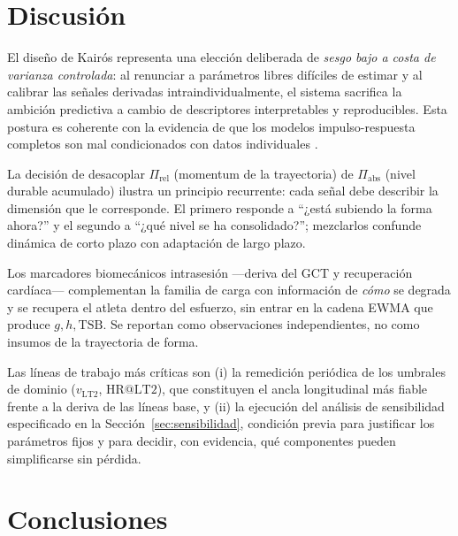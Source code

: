 \documentclass[11pt,a4paper]{article}
\begin{document}
\section{Discusión}

El diseño de Kairós representa una elección deliberada de \emph{sesgo bajo a costa de varianza controlada}: al renunciar a parámetros libres difíciles de estimar y al calibrar las señales derivadas intraindividualmente, el sistema sacrifica la ambición predictiva a cambio de descriptores interpretables y reproducibles. Esta postura es coherente con la evidencia de que los modelos impulso-respuesta completos son mal condicionados con datos individuales \citep{hellard2006}.

La decisión de desacoplar $\Pi_{\mathrm{rel}}$ (momentum de la trayectoria) de $\Pi_{\mathrm{abs}}$ (nivel durable acumulado) ilustra un principio recurrente: cada señal debe describir la dimensión que le corresponde. El primero responde a ``¿está subiendo la forma ahora?'' y el segundo a ``¿qué nivel se ha consolidado?''; mezclarlos confunde dinámica de corto plazo con adaptación de largo plazo.

Los marcadores biomecánicos intrasesión —deriva del GCT y recuperación cardíaca— complementan la familia de carga con información de \emph{cómo} se degrada y se recupera el atleta dentro del esfuerzo, sin entrar en la cadena EWMA que produce $g,h,\mathrm{TSB}$. Se reportan como observaciones independientes, no como insumos de la trayectoria de forma.

Las líneas de trabajo más críticas son (i) la remedición periódica de los umbrales de dominio ($v_{\mathrm{LT2}}$, $\mathrm{HR@LT2}$), que constituyen el ancla longitudinal más fiable frente a la deriva de las líneas base, y (ii) la ejecución del análisis de sensibilidad especificado en la Sección~\ref{sec:sensibilidad}, condición previa para justificar los parámetros fijos y para decidir, con evidencia, qué componentes pueden simplificarse sin pérdida.

\section{Conclusiones}
\end{document}
